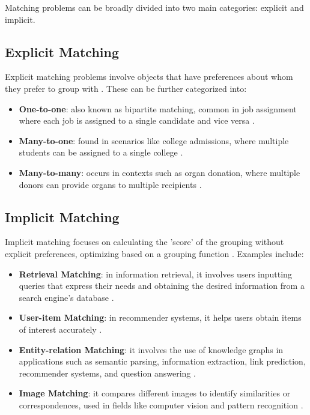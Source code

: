         
        
        Matching problems can be broadly divided into two main categories: explicit and implicit.
        
        \subsection{Explicit Matching}
            Explicit matching problems involve objects that have preferences about whom they prefer to group with \cite{ieee_survey, manlove2013algorithmics}. These can be further categorized into:
            
            \begin{itemize}
                \item \textbf{One-to-one}: also known as bipartite matching, common in job assignment where each job is assigned to a single candidate and vice versa \cite{kuhn1955hungarian}.
                \item \textbf{Many-to-one}: found in scenarios like college admissions, where multiple students can be assigned to a single college \cite{gale1962college}.
                \item \textbf{Many-to-many}: occurs in contexts such as organ donation, where multiple donors can provide organs to multiple recipients \cite{roth2004kidney}.
            \end{itemize}
        
        \subsection{Implicit Matching}
            Implicit matching focuses on calculating the 'score' of the grouping without explicit preferences, optimizing based on a grouping function \cite{ieee_survey}. Examples include:
            
            \begin{itemize}
                \item \textbf{Retrieval Matching}: in information retrieval, it involves users inputting queries that express their needs and obtaining the desired information from a search engine's database \cite{manning2008introduction}.
                \item \textbf{User-item Matching}: in recommender systems, it helps users obtain items of interest accurately \cite{ricci2011introduction}.
                \item \textbf{Entity-relation Matching}: it involves the use of knowledge graphs in applications such as semantic parsing, information extraction, link prediction, recommender systems, and question answering \cite{ji2021survey}.
                \item \textbf{Image Matching}: it compares different images to identify similarities or correspondences, used in fields like computer vision and pattern recognition \cite{szeliski2010computer}.
            \end{itemize}

